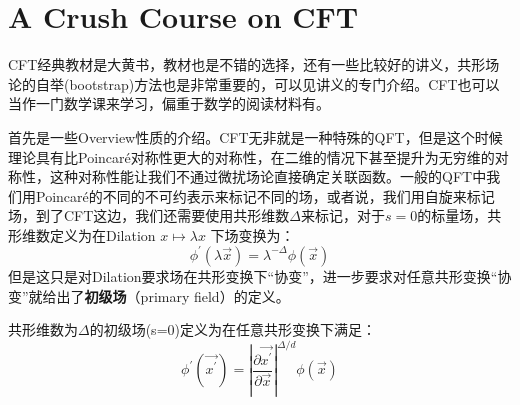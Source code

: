 \part{A Crush Course on CFT}
\setcounter{theorem}{0}
\setcounter{definition}{0}
\setcounter{lemma}{0}
\setcounter{sidenote}{1}

CFT经典教材是大黄书\cite{DiFrancesco:1997nk}，教材\cite{Blumenhagen:2009zz,ito}也是不错的选择，还有一些比较好的讲义\cite{Nawata:2022lsw,Ginsparg:1988ui,Qualls:2015qjb}，共形场论的自举(bootstrap)方法也是非常重要的，可以见讲义\cite{Ribault:2014hia}的专门介绍。CFT也可以当作一门数学课来学习，偏重于数学的阅读材料有\cite{Schottenloher:2008zz}。

首先是一些Overview性质的介绍。CFT无非就是一种特殊的QFT，但是这个时候理论具有比Poincar\'e对称性更大的对称性，在二维的情况下甚至提升为无穷维的对称性，这种对称性能让我们不通过微扰场论直接确定关联函数。一般的QFT中我们用Poincar\'e的不同的不可约表示来标记不同的场，或者说，我们用自旋来标记场，到了CFT这边，我们还需要使用共形维数$\Delta$来标记，对于$s=0$的标量场，共形维数定义为在Dilation $x\mapsto\lambda x$ 下场变换为：
\begin{equation}
	\phi^\prime(\lambda \vec{x})=\lambda^{-\Delta}\phi(\vec x)
\end{equation}
但是这只是对Dilation要求场在共形变换下“协变”，进一步要求对任意共形变换“协变”就给出了\textbf{初级场}（primary field）的定义。
\begin{definition}
	共形维数为$\Delta$的初级场(s=0)定义为在任意共形变换下满足：
	\begin{equation}
		\label{28.27}
		\phi^\prime(\vec{x^\prime})=\left|\frac{\partial \vec {x^\prime}}{\partial \vec {x}}\right|^{\Delta/d}\phi(\vec {x})
	\end{equation}
\end{definition}

